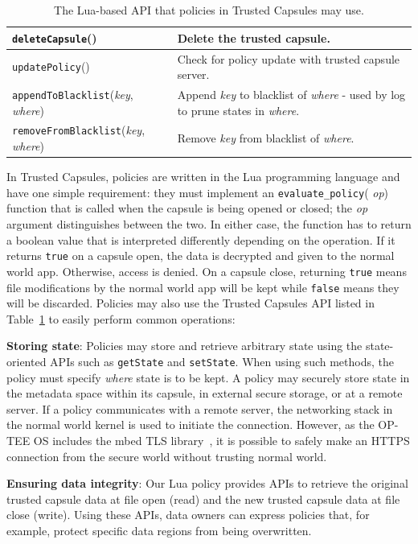 \begin{table}[t]
\begin{center}
{\begin{tabular}{l|l}
  {\tt deleteCapsule}()
  & Delete the trusted capsule.\\\hline

  {\tt updatePolicy}()
  & Check for policy update with trusted capsule server. \\\hline

  {\tt appendToBlacklist}({\em key}, {\em where})
  & Append {\em key} to blacklist of {\em where} - used by log to prune states in {\em where}. \\\hline

  {\tt removeFromBlacklist}({\em key}, {\em where})
  & Remove {\em key} from blacklist of {\em where}. \\\hline

\end{tabular}
}
\caption{The Lua-based API that policies in Trusted Capsules may use.}
\label{Tbl:lua_ext}
\end{center}
\end{table}

In Trusted Capsules, policies are written in the Lua programming language and
have one simple requirement: they must implement an {\tt evaluate\_policy}({\em
  op}) function that is called when the capsule is being opened or closed; the
{\em op} argument distinguishes between the two. In either case, the function
has to return a boolean value that is interpreted differently depending on the
operation. If it returns {\tt true} on a capsule open, the data is decrypted and
given to the normal world app. Otherwise, access is denied. On a capsule close,
returning {\tt true} means file modifications by the normal world app will be
kept while {\tt false} means they will be discarded. Policies may also use the
Trusted Capsules API listed in Table~\ref{Tbl:lua_ext} to easily perform common
operations:

\textbf{Storing state}: Policies may store and retrieve arbitrary state using
the state-oriented APIs such as {\tt getState} and {\tt setState}. When using
such methods, the policy must specify {\em where}
state is to be kept. A policy may securely store state in the metadata space within
its capsule, in external secure storage, or at a remote server. If a policy
communicates with a remote server, the networking stack in the normal world
kernel is used to initiate the connection. However, as the OP-TEE OS includes
the mbed TLS library~\cite{mbed}, it is possible to safely make an HTTPS
connection from the secure world without trusting normal world.

\textbf{Ensuring data integrity}: Our Lua policy provides APIs to retrieve the
original trusted capsule data at file open (read) and the new trusted capsule
data at file close (write). Using these APIs, data owners can express
policies that, for example, protect specific data regions from being
overwritten. %

